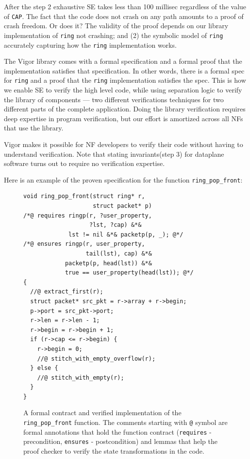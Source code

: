 \documentclass[letterpaper,twocolumn,10pt]{article}
\newcommand{\code}[1]{\lstinline{#1}}
\begin{document}
After the step 2 exhaustive SE takes less than 100 millisec regardless of the
value of \code{CAP}. The fact that the code does not
crash on any path amounts to a proof of crash freedom. Or does it? The validity
of the proof depends on our library implementation of \code{ring} not
crashing; and (2) the symbolic model of \code{ring} accurately capturing how the
\code{ring} implementation works.

The Vigor library comes with a formal specification and a formal proof that the
implementation satisfies that specification. In other words, there is a formal
spec for \code{ring} and a proof that the \code{ring} implementation satisfies
the spec. This is how we enable SE to verify the high level code, while using
separation logic to verify the library of components --- two different
verifications techniques for two different parts of the complete application.
Doing the library verification requires deep expertise in program verification,
but our effort is amortized across all NFs that use the library.

Vigor makes it possible for NF developers to verify their code without having to
understand verification. Note that stating invariants(step 3) for dataplane
software turns out to require no verification expertise.

Here is an example of the proven specification for the function
\code{ring_pop_front}:

\begin{figure}[h!]
\begin{lstlisting}
void ring_pop_front(struct ring* r,
                    struct packet* p)
/*@ requires ringp(r, ?user_property,
                   ?lst, ?cap) &*&
             lst != nil &*& packetp(p, _); @*/
/*@ ensures ringp(r, user_property,
                  tail(lst), cap) &*&
            packetp(p, head(lst)) &*&
            true == user_property(head(lst)); @*/
{
  //@ extract_first(r);
  struct packet* src_pkt = r->array + r->begin;
  p->port = src_pkt->port;
  r->len = r->len - 1;
  r->begin = r->begin + 1;
  if (r->cap <= r->begin) {
    r->begin = 0;
    //@ stitch_with_empty_overflow(r);
  } else {
    //@ stitch_with_empty(r);
  }
}
\end{lstlisting}
  \caption{A formal contract and verified implementation of the
    \code{ring_pop_front} function. The comments starting with \code{@} symbol
    are formal annotations that hold the function contract (\code{requires} -
    precondition, \code{ensures} - postcondition) and lemmas that help the proof
    checker to verify the state transformations in the code.}
  \label{lst:contract}
\end{figure}
\end{document}

